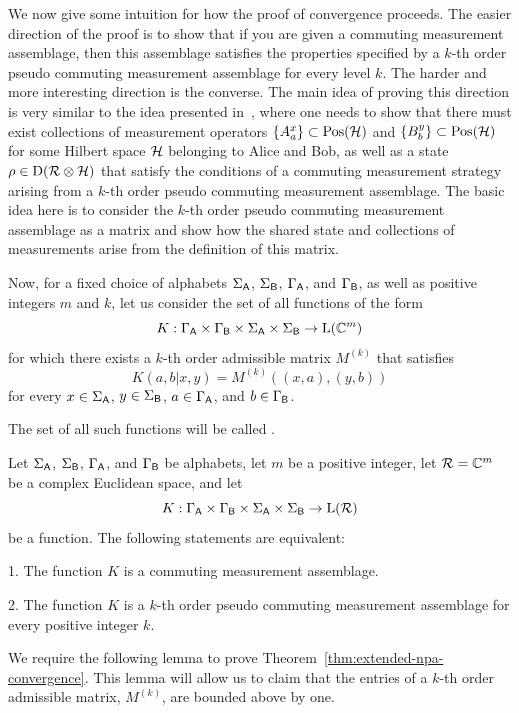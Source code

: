 We now give some intuition for how the proof of convergence proceeds. The easier direction of the proof is to show that if you are given a commuting measurement assemblage, then this assemblage satisfies the properties specified by a $k$-th order pseudo commuting measurement assemblage for every level $k$. The harder and more interesting direction is the converse. The main idea of proving this direction is very similar to the idea presented in~\cite{Navascues2008}, where one needs to show that there must exist collections of measurement operators $\{A_a^x\} \subset \mathrm{Pos}(\mathcal{H})$ and $\{B_b^y\} \subset \mathrm{Pos}(\mathcal{H})$ for some Hilbert space $\mathcal{H}$ belonging to Alice and Bob, as well as a state $\rho \in \mathrm{D}(\mathcal{R} \otimes \mathcal{H})$ that satisfy the conditions of a commuting measurement strategy arising from a $k$-th order pseudo commuting measurement assemblage. The basic idea here is to consider the $k$-th order pseudo commuting measurement assemblage as a matrix and show how the shared state and collections of measurements arise from the definition of this matrix. 

Now, for a fixed choice of alphabets $\Sigma_{\mathsf{A}}$, $\Sigma_{\mathsf{B}}$, $\Gamma_{\mathsf{A}}$, and $\Gamma_{\mathsf{B}}$, as well as positive
integers $m$ and $k$, let us consider the set of all functions of the form
\begin{equation}
  K : \Gamma_{\mathsf{A}} \times \Gamma_{\mathsf{B}} \times \Sigma_{\mathsf{A}} \times \Sigma_{\mathsf{B}} \rightarrow \mathrm{L}(\mathbb{C}^m)
\end{equation}
for which there exists a $k$-th order admissible matrix $M^{(k)}$ that satisfies
\begin{equation}
  K(a,b|x,y) = M^{(k)}((x,a),(y,b))
\end{equation}
for every $x\in \Sigma_{\mathsf{A}}$, $y\in \Sigma_{\mathsf{B}}$, $a\in \Gamma_{\mathsf{A}}$, and $b\in \Gamma_{\mathsf{B}}$.

The set of all such functions will be called . 

\begin{theorem} \label{thm:extended-npa-convergence}
  Let $\Sigma_{\mathsf{A}}$, $\Sigma_{\mathsf{B}}$, $\Gamma_{\mathsf{A}}$, and $\Gamma_{\mathsf{B}}$ be alphabets, let $m$ be a positive integer, let $\mathcal{R} = \mathbb{C}^m$ be a complex Euclidean space, and
  let
  \begin{equation}
    K : \Gamma_{\mathsf{A}} \times \Gamma_{\mathsf{B}} \times \Sigma_{\mathsf{A}} \times \Sigma_{\mathsf{B}} \rightarrow \mathrm{L}(\mathcal{R})
  \end{equation}
  be a function.
  The following statements are equivalent:
  \begin{mylist}{\parindent}
  \item[1.]
    The function $K$ is a commuting measurement assemblage.
  \item[2.]
    The function $K$ is a $k$-th order pseudo commuting measurement assemblage for every
    positive integer $k$.
  \end{mylist}
\end{theorem}
We require the following lemma to prove Theorem~\ref{thm:extended-npa-convergence}. This lemma will allow us to claim that the entries of a $k$-th order admissible matrix, $M^{(k)}$, are bounded above by one. 

